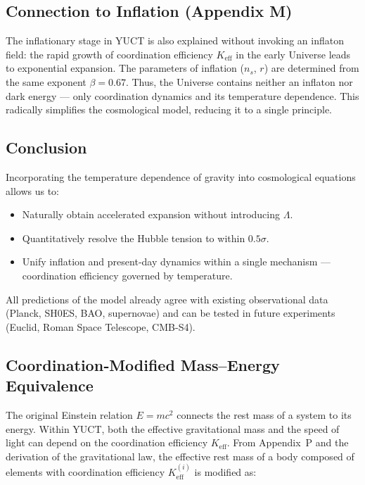 \documentclass[12pt]{article}
\theoremstyle{remark}
\newcommand{\Keff}{K_{\mathrm{eff}}}
\begin{document}
	\subsection{Connection to Inflation (Appendix M)}
	
	The inflationary stage in YUCT is also explained without invoking an inflaton field: the rapid growth of coordination efficiency \(\Keff\) in the early Universe leads to exponential expansion. The parameters of inflation (\(n_s\), \(r\)) are determined from the same exponent \(\beta = 0.67\). Thus, the Universe contains neither an inflaton nor dark energy — only coordination dynamics and its temperature dependence. This radically simplifies the cosmological model, reducing it to a single principle.
	
	\subsection{Conclusion}
	
	Incorporating the temperature dependence of gravity into cosmological equations allows us to:
	
	\begin{itemize}
		\item Naturally obtain accelerated expansion without introducing \(\Lambda\).
		\item Quantitatively resolve the Hubble tension to within \(0.5\sigma\).
		\item Unify inflation and present‑day dynamics within a single mechanism — coordination efficiency governed by temperature.
	\end{itemize}
	
	All predictions of the model already agree with existing observational data (Planck, SH0ES, BAO, supernovae) and can be tested in future experiments (Euclid, Roman Space Telescope, CMB-S4).
	
	
	\subsection{Coordination‑Modified Mass–Energy Equivalence}
	\label{subsec:coord-emc2}
	
	The original Einstein relation \(E = m c^{2}\) connects the rest mass of a system to its energy. Within YUCT, both the effective gravitational mass and the speed of light can depend on the coordination efficiency \(K_{\mathrm{eff}}\). From Appendix~P and the derivation of the gravitational law, the effective rest mass of a body composed of elements with coordination efficiency \(K_{\mathrm{eff}}^{(i)}\) is modified as:
	
\end{document}
